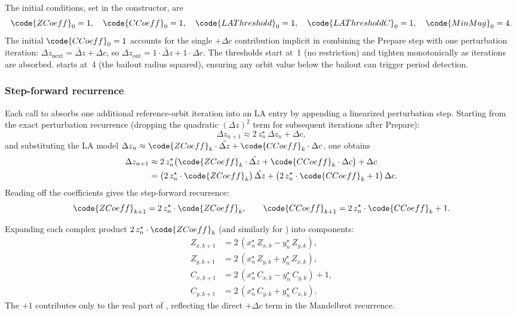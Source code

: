 The initial conditions, set in the  constructor, are
\[
\code{ZCoeff}_0 = 1,\quad \code{CCoeff}_0 = 1,\quad
\code{LAThreshold}_0 = 1,\quad \code{LAThresholdC}_0 = 1,\quad
\code{MinMag}_0 = 4.
\]
The initial \(\code{CCoeff}_0 = 1\) accounts for the single \(+\Delta c\)
contribution implicit in combining the Prepare step with one perturbation
iteration: \(\Delta z_\mathrm{next} = \tilde{\Delta z} + \Delta c\), so
\(\Delta z_\mathrm{out} = 1\cdot\tilde{\Delta z} + 1\cdot\Delta c\).
The thresholds start at~1 (no restriction) and tighten monotonically as
iterations are absorbed.   starts at~4 (the bailout radius
squared), ensuring any orbit value below the bailout can trigger
period detection.

\subsubsection{Step-forward recurrence}
\label{sec:la-step-forward}

Each call to  absorbs one additional reference-orbit
iteration into an LA entry by appending a linearized perturbation step.
Starting from the exact perturbation recurrence (dropping the quadratic
\((\Delta z)^2\) term for subsequent iterations after Prepare):
\[
\Delta z_{n+1} \approx 2\,z_n^\star\,\Delta z_n + \Delta c,
\]
and substituting the LA model
\(\Delta z_n \approx \code{ZCoeff}_k\cdot\tilde{\Delta z}
                    + \code{CCoeff}_k\cdot\Delta c\), one obtains
\begin{align}
\Delta z_{n+1}
  &\approx 2\,z_n^\star\bigl(
      \code{ZCoeff}_k\cdot\tilde{\Delta z}
    + \code{CCoeff}_k\cdot\Delta c
    \bigr) + \Delta c \\
  &= \bigl(2\,z_n^\star\cdot\code{ZCoeff}_k\bigr)\,\tilde{\Delta z}
   + \bigl(2\,z_n^\star\cdot\code{CCoeff}_k + 1\bigr)\,\Delta c.
\end{align}
Reading off the coefficients gives the step-forward recurrence:
\begin{equation}
\code{ZCoeff}_{k+1} = 2\,z_n^\star\cdot\code{ZCoeff}_k,\qquad
\code{CCoeff}_{k+1} = 2\,z_n^\star\cdot\code{CCoeff}_k + 1.
\label{eq:la-step}
\end{equation}

Expanding each complex product $2\,z_n^\star \cdot \code{ZCoeff}_k$
(and similarly for ) into components:
\begin{align}
Z_{x,k+1} &= 2\,(x_n^\star\,Z_{x,k} - y_n^\star\,Z_{y,k}), \\
Z_{y,k+1} &= 2\,(x_n^\star\,Z_{y,k} + y_n^\star\,Z_{x,k}), \\
C_{x,k+1} &= 2\,(x_n^\star\,C_{x,k} - y_n^\star\,C_{y,k}) + 1, \\
C_{y,k+1} &= 2\,(x_n^\star\,C_{y,k} + y_n^\star\,C_{x,k}).
\end{align}
The $+1$ contributes only to the real part of , reflecting
the direct $+\Delta c$ term in the Mandelbrot recurrence.

